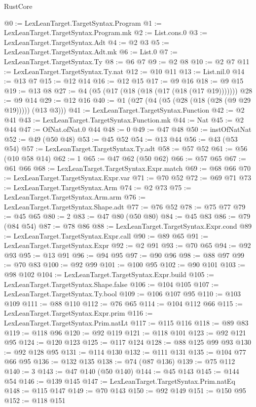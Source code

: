 \begin{lexlean}{RustCore}
\begin{coremodule}
@0 := LexLeanTarget.TargetSyntax.Program
@1 := LexLeanTarget.TargetSyntax.Program.mk
@2 := List.cons.{0}
@3 := LexLeanTarget.TargetSyntax.Adt
@4 := @2 @3
@5 := LexLeanTarget.TargetSyntax.Adt.mk
@6 := List.{0}
@7 := LexLeanTarget.TargetSyntax.Ty
@8 := @6 @7
@9 := @2 @8
@10 := @2 @7
@11 := LexLeanTarget.TargetSyntax.Ty.nat
@12 := @10 @11
@13 := List.nil.{0}
@14 := @13 @7
@15 := @12 @14
@16 := @12 @15
@17 := @9 @16
@18 := @9 @15
@19 := @13 @8
@27 := @4 (@5 (@17 (@18 (@18 (@17 (@18 (@17 @19)))))))
@28 := @9 @14
@29 := @12 @16
@40 := @1 (@27 (@4 (@5 (@28 (@18 (@28 (@9 @29 @19))))) (@13 @3)))
@41 := LexLeanTarget.TargetSyntax.Function
@42 := @2 @41
@43 := LexLeanTarget.TargetSyntax.Function.mk
@44 := Nat
@45 := @2 @44
@47 := OfNat.ofNat.{0} @44
@48 := 0
@49 := @47 @48
@50 := instOfNatNat
@52 := @49 (@50 @48)
@53 := @45 @52
@54 := @13 @44
@56 := @43 (@53 @54)
@57 := LexLeanTarget.TargetSyntax.Ty.adt
@58 := @57 @52
@61 := @56 (@10 @58 @14)
@62 := 1
@65 := @47 @62 (@50 @62)
@66 := @57 @65
@67 := @61 @66
@68 := LexLeanTarget.TargetSyntax.Expr.match
@69 := @68 @66
@70 := LexLeanTarget.TargetSyntax.Expr.var
@71 := @70 @52
@72 := @69 @71
@73 := LexLeanTarget.TargetSyntax.Arm
@74 := @2 @73
@75 := LexLeanTarget.TargetSyntax.Arm.arm
@76 := LexLeanTarget.TargetSyntax.Shape.adt
@77 := @76 @52
@78 := @75 @77
@79 := @45 @65
@80 := 2
@83 := @47 @80 (@50 @80)
@84 := @45 @83
@86 := @79 (@84 @54)
@87 := @78 @86
@88 := LexLeanTarget.TargetSyntax.Expr.cond
@89 := LexLeanTarget.TargetSyntax.Expr.call
@90 := @89 @65
@91 := LexLeanTarget.TargetSyntax.Expr
@92 := @2 @91
@93 := @70 @65
@94 := @92 @93
@95 := @13 @91
@96 := @94 @95
@97 := @90 @96
@98 := @88 @97
@99 := @70 @83
@100 := @92 @99
@101 := @100 @95
@102 := @90 @101
@103 := @98 @102
@104 := LexLeanTarget.TargetSyntax.Expr.build
@105 := LexLeanTarget.TargetSyntax.Shape.false
@106 := @104 @105
@107 := LexLeanTarget.TargetSyntax.Ty.bool
@109 := @106 @107 @95
@110 := @103 @109
@111 := @88 @110
@112 := @76 @65
@114 := @104 @112 @66
@115 := LexLeanTarget.TargetSyntax.Expr.prim
@116 := LexLeanTarget.TargetSyntax.Prim.natLt
@117 := @115 @116
@118 := @89 @83
@119 := @118 @96
@120 := @92 @119
@121 := @118 @101
@123 := @92 @121 @95
@124 := @120 @123
@125 := @117 @124
@128 := @88 @125 @99 @93
@130 := @92 @128 @95
@131 := @114 @130
@132 := @111 @131
@135 := @104 @77 @66 @95
@136 := @132 @135
@138 := @74 (@87 @136)
@139 := @75 @112
@140 := 3
@143 := @47 @140 (@50 @140)
@144 := @45 @143
@145 := @144 @54
@146 := @139 @145
@147 := LexLeanTarget.TargetSyntax.Prim.natEq
@148 := @115 @147
@149 := @70 @143
@150 := @92 @149
@151 := @150 @95
@152 := @118 @151

\end{coremodule}
\end{lexlean}
